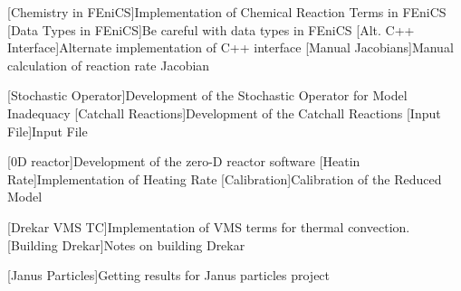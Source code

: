 

[Chemistry in FEniCS]{Implementation of Chemical Reaction Terms in FEniCS}
[Data Types in FEniCS]{Be careful with data types in FEniCS}
[Alt. C++ Interface]{Alternate implementation of C++ interface}
[Manual Jacobians]{Manual calculation of reaction rate Jacobian}

[Stochastic Operator]{Development of the Stochastic Operator for Model Inadequacy}
[Catchall Reactions]{Development of the Catchall Reactions}
[Input File]{Input File}

[0D reactor]{Development of the zero-D reactor software}
[Heatin Rate]{Implementation of Heating Rate}
[Calibration]{Calibration of the Reduced Model}

[Drekar VMS TC]{Implementation of VMS terms for thermal convection.}
[Building Drekar]{Notes on building Drekar}

[Janus Particles]{Getting results for Janus particles project}

